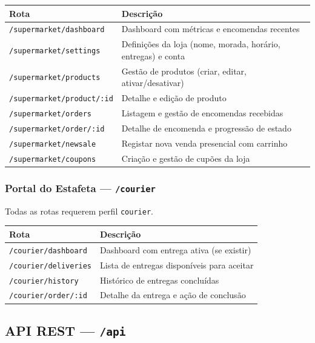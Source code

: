 \documentclass[12pt,a4paper]{article}
\begin{document}
\begin{center}
\begin{tabular}{ll}
\toprule
\textbf{Rota} & \textbf{Descrição} \\
\midrule
\texttt{/supermarket/dashboard}     & Dashboard com métricas e encomendas recentes \\
\texttt{/supermarket/settings}      & Definições da loja (nome, morada, horário, entregas) e conta \\
\texttt{/supermarket/products}      & Gestão de produtos (criar, editar, ativar/desativar) \\
\texttt{/supermarket/product/:id}   & Detalhe e edição de produto \\
\texttt{/supermarket/orders}        & Listagem e gestão de encomendas recebidas \\
\texttt{/supermarket/order/:id}     & Detalhe de encomenda e progressão de estado \\
\texttt{/supermarket/newsale}       & Registar nova venda presencial com carrinho \\
\texttt{/supermarket/coupons}       & Criação e gestão de cupões da loja \\
\bottomrule
\end{tabular}
\end{center}

\subsubsection{Portal do Estafeta --- \texttt{/courier}}

Todas as rotas requerem perfil \texttt{courier}.

\begin{center}
\begin{tabular}{ll}
\toprule
\textbf{Rota} & \textbf{Descrição} \\
\midrule
\texttt{/courier/dashboard}   & Dashboard com entrega ativa (se existir) \\
\texttt{/courier/deliveries}  & Lista de entregas disponíveis para aceitar \\
\texttt{/courier/history}     & Histórico de entregas concluídas \\
\texttt{/courier/order/:id}   & Detalhe da entrega e ação de conclusão \\
\bottomrule
\end{tabular}
\end{center}

\subsection{API REST --- \texttt{/api}}
\end{document}
